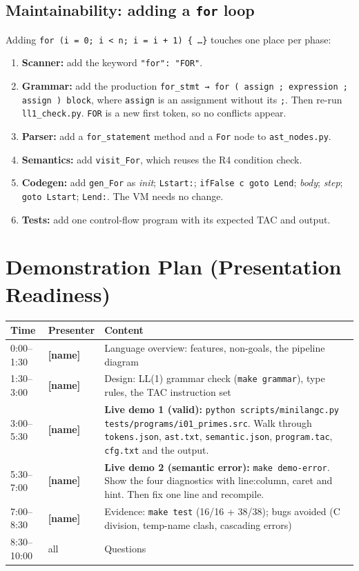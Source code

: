 \documentclass[11pt,letterpaper]{article}
\newcommand{\fillin}[1]{\textcolor{fill}{\textbf{[#1]}}}   %
\newcommand{\code}[1]{\texttt{#1}}
\begin{document}
\subsection{Maintainability: adding a \code{for} loop}
Adding \code{for (i = 0; i < n; i = i + 1) \{ \ldots \}} touches one place per phase:
\begin{enumerate}
  \item \textbf{Scanner:} add the keyword \code{"for": "FOR"}.
  \item \textbf{Grammar:} add the production \code{for\_stmt → for ( assign ; expression ; assign ) block}, where \code{assign} is an assignment without its \code{;}. Then re-run \code{ll1\_check.py}. \code{FOR} is a new first token, so no conflicts appear.
  \item \textbf{Parser:} add a \code{for\_statement} method and a \code{For} node to \code{ast\_nodes.py}.
  \item \textbf{Semantics:} add \code{visit\_For}, which reuses the R4 condition check.
  \item \textbf{Codegen:} add \code{gen\_For} as \emph{init}; \code{Lstart:}; \code{ifFalse c goto Lend}; \emph{body}; \emph{step}; \code{goto Lstart}; \code{Lend:}. The VM needs no change.
  \item \textbf{Tests:} add one control-flow program with its expected TAC and output.
\end{enumerate}

\section{Demonstration Plan (Presentation Readiness)}

\begin{tabularx}{\linewidth}{l >{\raggedright}p{2.8cm} X}
\toprule
\textbf{Time} & \textbf{Presenter} & \textbf{Content} \\
\midrule
0:00--1:30 & \fillin{name} & Language overview: features, non-goals, the pipeline diagram \\
1:30--3:00 & \fillin{name} & Design: LL(1) grammar check (\code{make grammar}), type rules, the TAC instruction set \\
3:00--5:30 & \fillin{name} & \textbf{Live demo 1 (valid):} \code{python scripts/minilangc.py tests/programs/i01\_primes.src}. Walk through \code{tokens.json}, \code{ast.txt}, \code{semantic.json}, \code{program.tac}, \code{cfg.txt} and the output. \\
5:30--7:00 & \fillin{name} & \textbf{Live demo 2 (semantic error):} \code{make demo-error}. Show the four diagnostics with line:column, caret and hint. Then fix one line and recompile. \\
7:00--8:30 & \fillin{name} & Evidence: \code{make test} (16/16 + 38/38); bugs avoided (C division, temp-name clash, cascading errors) \\
8:30--10:00 & all & Questions \\
\bottomrule
\end{tabularx}
\end{document}
